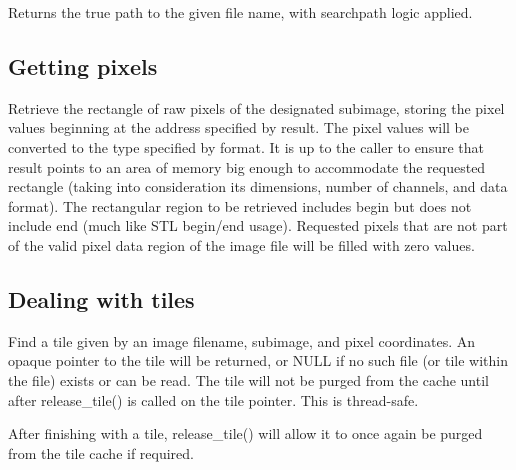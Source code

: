 Returns the true path to the given file name, with searchpath logic
applied.
\apiend

\subsection{Getting pixels}
\label{sec:imagecache:api:getpixels}


Retrieve the rectangle of raw pixels
of the designated {\cf subimage}, storing the pixel values
beginning at the address specified by result.  The pixel values will be
converted to the type specified by {\cf format}.  It is up to the caller
to ensure that result points to an area of memory big enough to
accommodate the requested rectangle (taking into consideration its
dimensions, number of channels, and data format).
The rectangular region to be retrieved includes {\cf begin} but does not
include {\cf end} (much like STL begin/end usage).
Requested pixels that are not part of the valid pixel data region of the
image file will be filled with zero values.
\apiend

\subsection{Dealing with tiles}
\label{sec:imagecache:api:tiles}

Find a tile given by an image {\cf filename}, {\cf subimage}, and pixel
coordinates.  An opaque pointer to the tile will be returned,
or {\cf NULL} if no such file (or tile within the file) exists or can
be read.  The tile will not be purged from the cache until 
after {\cf release_tile()} is called on the tile pointer.  This is
thread-safe.
\apiend

After finishing with a tile, {\cf release_tile()} will allow it to 
once again be purged from the tile cache if required.
\apiend

